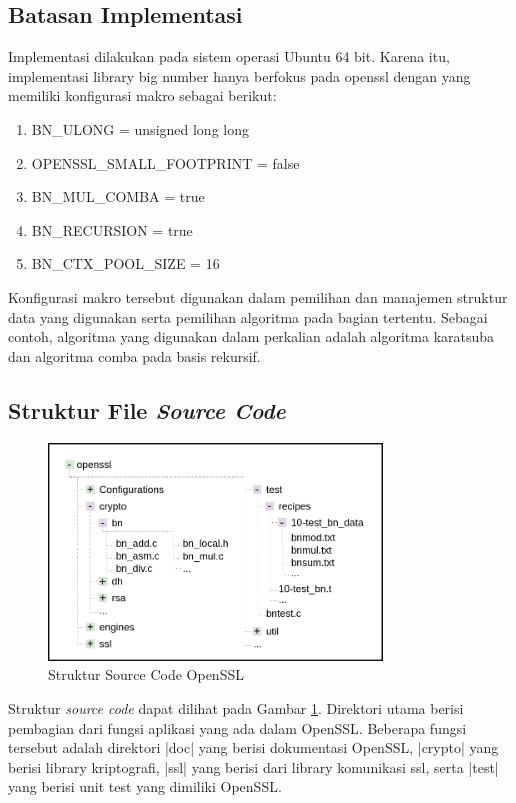   \subsection{Batasan Implementasi}
    Implementasi dilakukan pada sistem operasi Ubuntu 64 bit. Karena itu, implementasi library big number hanya berfokus pada openssl dengan yang memiliki konfigurasi makro sebagai berikut:

    \begin{enumerate}[label=\roman*.]
      \item BN\_ULONG = unsigned long long
      \item OPENSSL\_SMALL\_FOOTPRINT = false
      \item BN\_MUL\_COMBA = true
      \item BN\_RECURSION = true
      \item BN\_CTX\_POOL\_SIZE = 16
    \end{enumerate}
    Konfigurasi makro tersebut digunakan dalam pemilihan dan manajemen struktur data yang digunakan serta pemilihan algoritma pada bagian tertentu. Sebagai contoh, algoritma yang digunakan dalam perkalian adalah algoritma karatsuba dan algoritma comba pada basis rekursif.


  \subsection{Struktur File \textit{Source Code}}

    \begin{figure}[h]
      \centering
      \includegraphics[width=0.8\textwidth]{resources/img/ch-4/file-tree.png}
      \caption{Struktur Source Code OpenSSL}
      \label{fig:ossl_file_structure}
    \end{figure}

    Struktur \textit{source code} dapat dilihat pada Gambar \ref{fig:ossl_file_structure}. Direktori utama berisi pembagian dari fungsi aplikasi yang ada dalam OpenSSL. Beberapa fungsi tersebut adalah direktori |doc| yang berisi dokumentasi OpenSSL, |crypto| yang berisi library kriptografi, |ssl| yang berisi dari library komunikasi ssl, serta |test| yang berisi unit test yang dimiliki OpenSSL.

